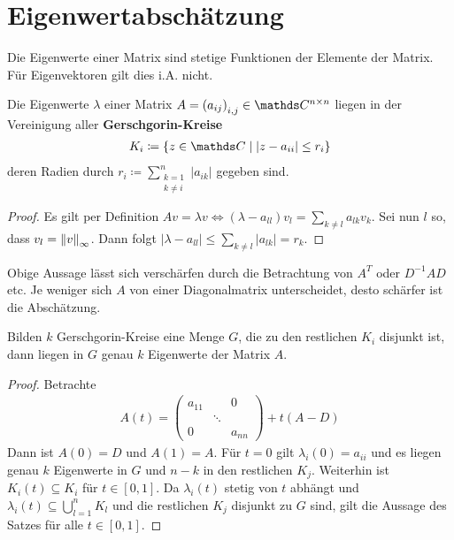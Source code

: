 % 
% 
% 
% 


\chapter{Eigenwertabschätzung}

Die Eigenwerte einer Matrix sind stetige Funktionen
der Elemente der Matrix.
Für Eigenvektoren gilt dies i.A. nicht.

\begin{Satze}[Gerschgorin, 1931]
  Die Eigenwerte $\lambda$ einer Matrix
  $A=\left(a_{ij}\right)_{i,j}\in \C^{n\times n}$
  liegen in der Vereinigung aller 
  \textbf{Gerschgorin-Kreise}
  \begin{gather*}
    K_i\coloneqq\left\{ z\in\C \mid |z-a_{ii}| \leq r_i\right\}
  \end{gather*}
  deren Radien durch 
  $r_i\coloneqq \sum_{\substack{k=1\\k\neq i}}^{n}|a_{ik}|$
  gegeben sind.

  \begin{proof}
    Es gilt per Definition
    $Av=\lambda v \Leftrightarrow 
    (\lambda - a_{ll})v_l = \sum_{k\neq l} a_{lk}v_k$.
    Sei nun $l$ so, dass $v_l=\nn[v]_\infty$. Dann folgt
    $|\lambda - a_{ll} | \leq \sum_{k\neq l} |a_{lk}|=r_k$.
  \end{proof}
\end{Satze}

Obige Aussage lässt sich verschärfen durch
die Betrachtung von $A^T$ oder $D^{-1}AD$ etc.
Je weniger sich $A$ von einer Diagonalmatrix unterscheidet,
desto schärfer ist die Abschätzung.

\begin{Satze}
  Bilden $k$ Gerschgorin-Kreise eine Menge $G$,
  die zu den restlichen $K_i$ disjunkt ist,
  dann liegen in $G$ genau $k$ Eigenwerte der Matrix $A$.

  \begin{proof}
    Betrachte
    \begin{gather*}
      A(t) =
      \begin{pmatrix}
        a_{11} && 0\\
        &\ddots \\
        0 && a_{nn}
      \end{pmatrix}
      +t(A-D)
    \end{gather*}
    Dann ist $A(0)=D$ und $A(1)=A$.
    Für $t=0$ gilt $\lambda_i(0)=a_{ii}$ und
    es liegen genau $k$ Eigenwerte in $G$ und
    $n-k$ in den restlichen $K_j$.
    Weiterhin ist $K_i(t) \subseteq K_i$ für $t\in[0,1]$.
    Da $\lambda_i(t)$ stetig von $t$
    abhängt und $\lambda_i(t) \subseteq \bigcup_{l=1}^{n}K_l$
    und die restlichen $K_j$ disjunkt zu $G$ sind,
    gilt die Aussage des Satzes für alle $t\in[0,1]$.
  \end{proof}
\end{Satze}


